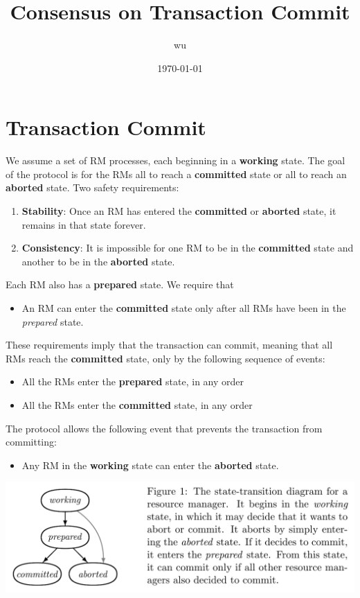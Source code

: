 \documentclass[11pt]{article}
\author{wu}
\date{\today}
\title{Consensus on Transaction Commit}
\begin{document}
\maketitle
\section{Transaction Commit}
\label{sec:orge8e52a5}
        We assume a set of RM processes, each beginning in a \textbf{working} state. The goal of the protocol is for
        the RMs all to reach a \textbf{committed} state or all to reach an \textbf{aborted} state.
Two safety requirements:
\begin{enumerate}
\item \textbf{Stability}: Once an RM has entered the \textbf{committed} or \textbf{aborted} state, it remains in that state forever.
\item \textbf{Consistency}: It is impossible for one RM to be in the \textbf{committed} state and another to be in the
\textbf{aborted} state.
\end{enumerate}

Each RM also has a \textbf{prepared} state. We require that
\begin{itemize}
\item An RM can enter the \textbf{committed} state only after all RMs have been in the \emph{prepared} state.
\end{itemize}

These requirements imply that the transaction can commit, meaning that all RMs reach the \textbf{committed}
state, only by the following sequence of events:
\begin{itemize}
\item All the RMs enter the \textbf{prepared} state, in any order
\item All the RMs enter the \textbf{committed} state, in any order
\end{itemize}

The protocol allows the following event that prevents the transaction from committing:
\begin{itemize}
\item Any RM in the \textbf{working} state can enter the \textbf{aborted} state.
\end{itemize}

\begin{center}
\includegraphics[width=.8\textwidth]{../../images/papers/1.png}
\label{}
\end{center}
\end{document}
